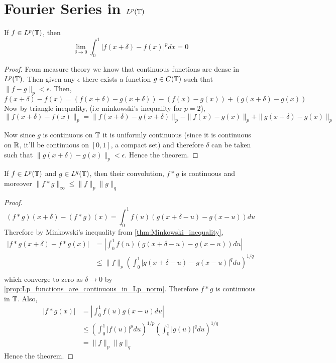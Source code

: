 \section{Fourier Series in $L^p(\mathbb T)$}
\begin{proposition}
  \label{prop:Lp_functions_are_continuous_in_Lp_norm}
  If $f \in L^p(\mathbb T)$, then
  \begin{displaymath}
   \lim_{\delta \to 0} \int_0^1 |f(x+\delta) - f(x)|^p dx = 0
  \end{displaymath}
\end{proposition}
\begin{proof}
  From measure theory we know that continuous functions are dense in $L^p(\mathbb T)$. Then given any $\epsilon$ there exists a function $g\in C(\mathbb T)$ such that $\|f-g\|_p < \epsilon$. Then,
  $$ f(x+\delta) - f(x) = (f(x+\delta) - g(x+\delta)) - (f(x) - g(x)) + ( g(x+\delta) - g(x))$$
  Now by triangle inequality, (i.e minkowski's inequality for $p = 2$), 
  $$ \|f(x+\delta) - f(x)\|_p = \|f(x+\delta) - g(x+\delta)\|_p - \|f(x) - g(x)\|_p + \|g(x+\delta) - g(x)\|_p$$

  Now since $g$ is continuous on $\mathbb T$ it is uniformly continuous (since it is continuous on $\mathbb R$, it'll be continuous on $[0,1]$, a compact set) and therefore $\delta$ can be taken such that $\|g(x+\delta) - g(x) \|_p < \epsilon$. Hence the theorem.
\end{proof}

\begin{proposition}
  \label{prop:convolution_of_Lp_functions}
  If $f \in L^p(\mathbb T)$ and $g \in L^q(\mathbb T)$, then their convolution, $f*g$ is continuous and moreover $\|f*g\|_{\infty} \le \|f\|_p \|g\|_q$
\end{proposition}
\begin{proof}
  $$(f*g)(x+\delta) - (f*g)(x) = \int_0^1 f(u)(g(x+\delta - u) - g(x-u)) du $$
  Therefore by Minkowski's inequality from \autoref{thm:Minkowski_inequality}, 
  \begin{align*}
    |f*g(x+\delta) - f*g(x)| &= \left| \int_0^1 f(u) (g(x + \delta -u)- g(x-u)) du \right| \\
          &\le \|f\|_p \left( \int_0^1|g(x+\delta - u) - g(x-u)|^q du \right)^{1/q} \\
  \end{align*}
  which converge to zero as $\delta \to 0$ by \autoref{prop:Lp_functions_are_continuous_in_Lp_norm}. Therefore $f*g$ is continuous in $\mathbb T$.
  Also, 
  \begin{align*}
    |f*g(x)| &= \left| \int_0^1 f(u)g(x-u) du \right| \\
            &\le \left(\int_0^1 |f(u)|^p du \right)^{1/p} \left(\int_0^1 |g(u)|^q du \right)^{1/q} \\
            &= \|f\|_p \|g\|_q
  \end{align*}
  Hence the theorem.
\end{proof}


